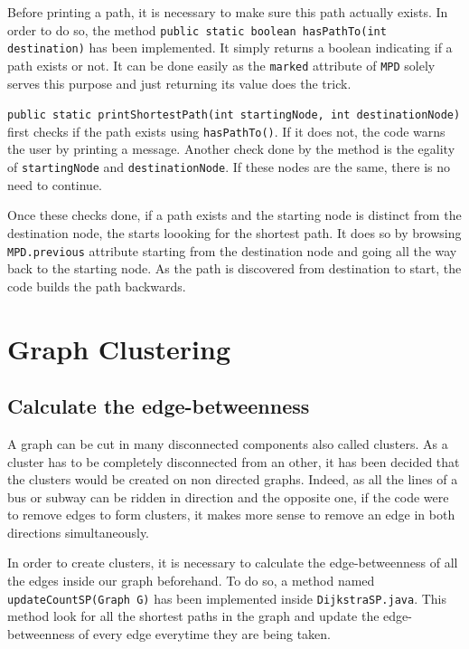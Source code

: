 \documentclass{article}
\begin{document}
Before printing a path, it is necessary to make sure this path actually exists. In order to do so, the method \texttt{public static boolean hasPathTo(int destination)} has been implemented. It simply returns a boolean indicating if a path exists or not. It can be done easily as the \texttt{marked} attribute of \texttt{MPD} solely serves this purpose and just returning its value does the trick.

\texttt{public static printShortestPath(int startingNode, int destinationNode)} first checks if the path exists using \texttt{hasPathTo()}. If it does not, the code warns the user by printing a message. Another check done by the method is the egality of \texttt{startingNode} and \texttt{destinationNode}. If these nodes are the same, there is no need to continue.

Once these checks done, if a path exists and the starting node is distinct from the destination node, the starts loooking for the shortest path. It does so by browsing \texttt{MPD.previous} attribute starting from the destination node and going all the way back to the starting node. As the path is discovered from destination to start, the code builds the path backwards.

\newpage

\section{Graph Clustering}

\subsection{Calculate the edge-betweenness}

A graph can be cut in many disconnected components also called clusters. As a cluster has to be completely disconnected from an other, it has been decided that the clusters would be created on non directed graphs. Indeed, as all the lines of a bus or subway can be ridden in direction and the opposite one, if the code were to remove edges to form clusters, it makes more sense to remove an edge in both directions simultaneously.

In order to create clusters, it is necessary to calculate the edge-betweenness of all the edges inside our graph beforehand. To do so, a method named \texttt{updateCountSP(Graph G)} has been implemented inside \texttt{DijkstraSP.java}. This method look for all the shortest paths in the graph and update the edge-betweenness of every edge everytime they are being taken.
\end{document}
